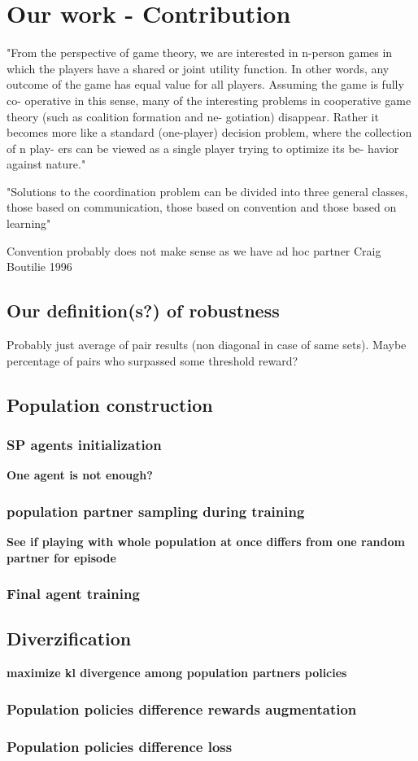 \chapter{Our work - Contribution}

"From the perspective of game theory, we are interested
in n-person games in which the players have a shared or joint
utility function. In other words, any outcome of the game has
equal value for all players. Assuming the game is fully co-
operative in this sense, many of the interesting problems in
cooperative game theory (such as coalition formation and ne-
gotiation) disappear. Rather it becomes more like a standard
(one-player) decision problem, where the collection of n play-
ers can be viewed as a single player trying to optimize its be-
havior against nature." 

"Solutions to the coordination problem can be divided into
three general classes, those based on communication, those
based on convention and those based on learning"

Convention probably does not make sense as we have ad hoc partner
Craig Boutilie 1996

\section{Our definition(s?) of robustness}
Probably just average of pair results (non diagonal in case of same sets).
Maybe percentage of pairs who surpassed some threshold reward?

\section{Population construction}

\subsection{SP agents initialization}
\textbf{One agent is not enough?}

\subsection{population partner sampling during training}
\textbf{See if playing with whole population at once differs from one random partner for episode}

\subsection{Final agent training}

\section{Diverzification}
\textbf{maximize kl divergence among population partners policies}

\subsection{Population policies difference rewards augmentation}

\subsection{Population policies difference loss}
